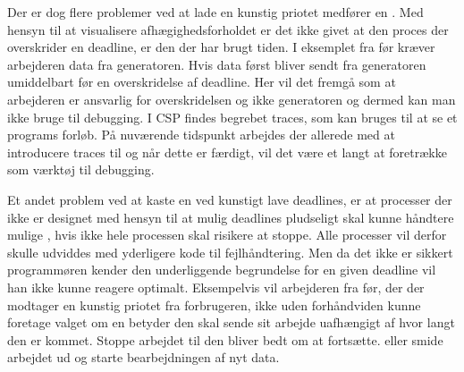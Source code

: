 Der er dog flere problemer ved at lade en kunstig priotet medfører en .  Med hensyn til at visualisere afhægighedsforholdet er det ikke givet at den proces der overskrider en deadline, er den der har brugt tiden. 
I eksemplet fra før kræver arbejderen data fra generatoren. Hvis data først bliver sendt fra generatoren umiddelbart før en overskridelse af deadline. Her vil det fremgå som at arbejderen er ansvarlig for overskridelsen og ikke generatoren og dermed kan man ikke bruge  til debugging. I CSP findes begrebet traces, som kan bruges til at se et programs forløb. På nuværende tidspunkt arbejdes der allerede med at introducere traces til \pycsp og når dette er færdigt, vil det være et langt at foretrække som værktøj til debugging.

Et andet problem ved at kaste en  ved kunstigt lave deadlines, er at processer der ikke er designet med hensyn til at mulig deadlines pludseligt skal kunne håndtere mulige , hvis ikke hele processen skal risikere at stoppe. Alle processer vil derfor skulle udviddes med yderligere kode til fejlhåndtering. Men da det ikke er sikkert programmøren kender den underliggende begrundelse for en given deadline vil han ikke kunne reagere optimalt. Eksempelvis  vil arbejderen fra før, der der modtager en kunstig priotet fra forbrugeren, ikke uden  forhåndviden kunne foretage valget om en  betyder den skal sende sit arbejde uafhængigt af hvor langt den er kommet. Stoppe arbejdet til den bliver bedt om at fortsætte. eller smide arbejdet ud og starte bearbejdningen af nyt data.
